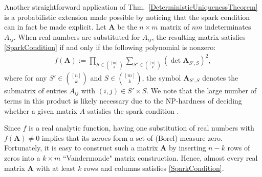\documentclass[9pt,twocolumn]{pnas-new}
\begin{document}

Another straightforward application of Thm.~\ref{DeterministicUniquenessTheorem} is a probabilistic extension made possible by noticing that the spark condition can in fact be made explicit.  Let $\mathbf{A}$  be the $n \times m$ matrix of $nm$ indeterminates $A_{ij}$. When real numbers are substituted for $A_{ij}$, the resulting matrix satisfies \eqref{SparkCondition} if and only if the following polynomial is nonzero:
\begin{align*}
f(\mathbf{A}) := \prod_{S \in {[m] \choose k}} \sum_{S' \in {[n] \choose k}} (\det \mathbf{A}_{S',S})^2,
\end{align*}
%
where for any $S' \in {[n] \choose k}$ and $S \in {[m] \choose k}$, the symbol $\mathbf{A}_{S',S}$ denotes the submatrix of entries $A_{ij}$ with $(i,j) \in S' \times S$.   We note that the large number of terms in this product is likely necessary due to the NP-hardness of deciding whether a given matrix $A$ satisfies the spark condition \cite{tillmann2014computational}.

Since $f$ is a real analytic function, having one substitution of real numbers with $f(\mathbf{A}) \neq 0$ implies that its zeroes form a set of (Borel) measure zero. Fortunately, it is easy to construct such a matrix $\mathbf{A}$ by inserting $n-k$ rows of zeros into a $k \times m$ ``Vandermonde" matrix construction. %
Hence, almost every real matrix $\mathbf{A}$ with at least $k$ rows and columns satisfies \eqref{SparkCondition}. %
\end{document}
